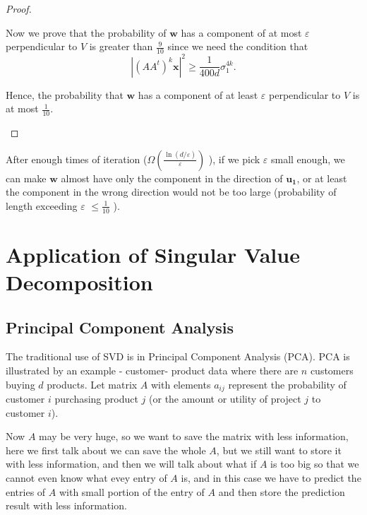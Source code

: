 \begin{proof}
  \begin{note}
    Now we prove that the probability of \(\mathbf{w} \) has a component of at most \(\varepsilon \) perpendicular to \(V\)  is greater than \(\frac{9}{10}\) since we need the condition that 
    \[
      \left\vert \left( A A^t \right)^k \mathbf{x}   \right\vert^2 \ge \frac{1}{400d}\sigma _1^{4k} .
    \]  

    Hence, the probability that \(\mathbf{w} \) has a component of at least \(\varepsilon \) perpendicular to \(V\)  is at most \(\frac{1}{10}\). 
  \end{note}
\end{proof}

\begin{note}
  After enough times of iteration (\(\Omega \left( \frac{\ln \left( d / \varepsilon  \right) }{\varepsilon } \right)\) ), if we pick \(\varepsilon \) small enough, we can make \(\mathbf{w} \) almost have only the component in the direction of \(\mathbf{u_1} \), or at least the component in the wrong direction would not be too large (probability of length exceeding \(\varepsilon \) \(\leq  \frac{1}{10}\) ).
\end{note}

\section{Application of Singular Value Decomposition}
\subsection{Principal Component Analysis}
The traditional use of SVD is in Principal Component Analysis (PCA). PCA is illustrated by an example - customer- product data where there are \(n\) customers buying \(d\) products. Let matrix \(A\) with elements \(a_{ij}\) represent the probability of customer \(i\) purchasing product \(j\) (or the amount or utility of project \(j\) to customer \(i\)). 

Now \(A\) may be very huge, so we want to save the matrix with less information, here we first talk about we can save the whole \(A\), but we still want to store it with less information, and then we will talk about what if \(A\) is too big so that we cannot even know what evey entry of \(A\) is, and in this case we have to predict the entries of \(A\) with small portion of the entry of \(A\) and then store the prediction result with less information.

